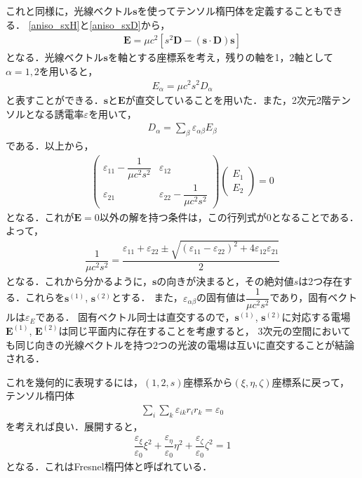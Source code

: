 これと同様に，光線ベクトル$\boldsymbol{s}$を使ってテンソル楕円体を定義することもできる．
\eqref{aniso_sxH}と\eqref{aniso_sxD}から，
\begin{align}
  \boldsymbol{E}=\mu{}c^2\left[s^2\boldsymbol{D}-(\boldsymbol{s}\cdot\boldsymbol{D})\boldsymbol{s}\right]
\end{align}
となる．光線ベクトル$\boldsymbol{s}$を軸とする座標系を考え，残りの軸を1，2軸として$\alpha=1,2$を用いると，
\begin{align}
  E_\alpha=\mu{c^2}s^2D_\alpha
\end{align}
と表すことができる．$\boldsymbol{s}$と$\boldsymbol{E}$が直交していることを用いた．また，2次元2階テンソルとなる誘電率$\varepsilon$を用いて，
\begin{align}
  D_\alpha=\sum_\beta\varepsilon_{\alpha\beta}E_\beta
\end{align}
である．以上から，
\begin{align}
  \begin{pmatrix}
    \varepsilon_{11}-\dfrac{1}{\mu{}c^2s^2} & \varepsilon_{12}\\
    \varepsilon_{21} & \varepsilon_{22}-\dfrac{1}{\mu{}c^2s^2}
  \end{pmatrix}
  \begin{pmatrix}
    E_1 \\
    E_2
  \end{pmatrix}
  =0
\end{align}
となる．これが$\boldsymbol{E}=0$以外の解を持つ条件は，この行列式が0となることである．よって，
\begin{align}
  \dfrac{1}{\mu{}c^2s^2}=\dfrac{\varepsilon_{11}+\varepsilon_{22}\pm\sqrt{(\varepsilon_{11}-\varepsilon_{22})^2+4\varepsilon_{12}\varepsilon_{21}}}{2}
\end{align}
となる．これから分かるように，$\boldsymbol{s}$の向きが決まると，その絶対値$s$は2つ存在する．これらを$\boldsymbol{s}^{(1)}$, $\boldsymbol{s}^{(2)}$とする．
また，$\varepsilon_{\alpha\beta}$の固有値は$\dfrac{1}{\mu{c^2}s^2}$であり，固有ベクトルは$\varepsilon_{E}$である．
固有ベクトル同士は直交するので，$\boldsymbol{s}^{(1)}$, $\boldsymbol{s}^{(2)}$に対応する電場$\boldsymbol{E}^{(1)}$, $\boldsymbol{E}^{(2)}$は同じ平面内に存在することを考慮すると，
3次元の空間においても同じ向きの光線ベクトルを持つ2つの光波の電場は互いに直交することが結論される．

これを幾何的に表現するには，$(1,2,s)$座標系から$(\xi,\eta,\zeta)$座標系に戻って，テンソル楕円体
\begin{align}
  \sum_i\sum_k\varepsilon_{ik}r_ir_k=\varepsilon_0
\end{align}
を考えれば良い．展開すると，
\begin{align}
  \dfrac{\varepsilon_\xi}{\varepsilon_0}\xi^2+\dfrac{\varepsilon_\eta}{\varepsilon_0}\eta^2+\dfrac{\varepsilon_\zeta}{\varepsilon_0}\zeta^2=1
\end{align}
となる．これはFresnel楕円体と呼ばれている．

